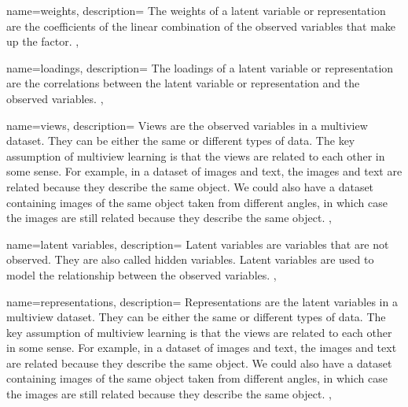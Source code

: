  {
    name={weights},
    description={
        The weights of a latent variable or representation are the coefficients of the linear combination of the observed variables that make up the factor.
    },
}

 {
    name={loadings},
    description={
        The loadings of a latent variable or representation are the correlations between the latent variable or representation and the observed variables.
    },
}

 {
    name={views},
    description={
        Views are the observed variables in a multiview dataset.
        They can be either the same or different types of data.
        The key assumption of multiview learning is that the views are related to each other in some sense.
        For example, in a dataset of images and text, the images and text are related because they describe the same object.
        We could also have a dataset containing images of the same object taken from different angles, in which case the images are still related because they describe the same object.
    },
}

 {
    name={latent variables},
    description={
        Latent variables are variables that are not observed.
        They are also called hidden variables.
        Latent variables are used to model the relationship between the observed variables.
    },
}

 {
    name={representations},
    description={
        Representations are the latent variables in a multiview dataset.
        They can be either the same or different types of data.
        The key assumption of multiview learning is that the views are related to each other in some sense.
        For example, in a dataset of images and text, the images and text are related because they describe the same object.
        We could also have a dataset containing images of the same object taken from different angles, in which case the images are still related because they describe the same object.
    },
}